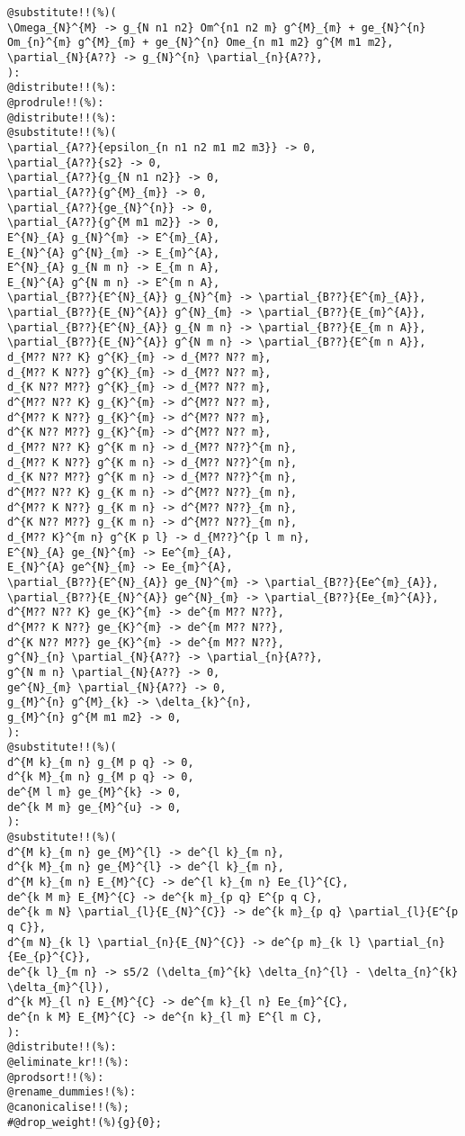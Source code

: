 \documentclass[11pt]{article}
\begin{document}
{\color[named]{Blue}\begin{verbatim}
@substitute!!(%)(
\Omega_{N}^{M} -> g_{N n1 n2} Om^{n1 n2 m} g^{M}_{m} + ge_{N}^{n} Om_{n}^{m} g^{M}_{m} + ge_{N}^{n} Ome_{n m1 m2} g^{M m1 m2},
\partial_{N}{A??} -> g_{N}^{n} \partial_{n}{A??},
):
@distribute!!(%):
@prodrule!!(%):
@distribute!!(%):
@substitute!!(%)(
\partial_{A??}{epsilon_{n n1 n2 m1 m2 m3}} -> 0,
\partial_{A??}{s2} -> 0,
\partial_{A??}{g_{N n1 n2}} -> 0,
\partial_{A??}{g^{M}_{m}} -> 0,
\partial_{A??}{ge_{N}^{n}} -> 0,
\partial_{A??}{g^{M m1 m2}} -> 0,
E^{N}_{A} g_{N}^{m} -> E^{m}_{A},
E_{N}^{A} g^{N}_{m} -> E_{m}^{A},
E^{N}_{A} g_{N m n} -> E_{m n A},
E_{N}^{A} g^{N m n} -> E^{m n A},
\partial_{B??}{E^{N}_{A}} g_{N}^{m} -> \partial_{B??}{E^{m}_{A}},
\partial_{B??}{E_{N}^{A}} g^{N}_{m} -> \partial_{B??}{E_{m}^{A}},
\partial_{B??}{E^{N}_{A}} g_{N m n} -> \partial_{B??}{E_{m n A}},
\partial_{B??}{E_{N}^{A}} g^{N m n} -> \partial_{B??}{E^{m n A}},
d_{M?? N?? K} g^{K}_{m} -> d_{M?? N?? m},
d_{M?? K N??} g^{K}_{m} -> d_{M?? N?? m},
d_{K N?? M??} g^{K}_{m} -> d_{M?? N?? m},
d^{M?? N?? K} g_{K}^{m} -> d^{M?? N?? m},
d^{M?? K N??} g_{K}^{m} -> d^{M?? N?? m},
d^{K N?? M??} g_{K}^{m} -> d^{M?? N?? m},
d_{M?? N?? K} g^{K m n} -> d_{M?? N??}^{m n},
d_{M?? K N??} g^{K m n} -> d_{M?? N??}^{m n},
d_{K N?? M??} g^{K m n} -> d_{M?? N??}^{m n},
d^{M?? N?? K} g_{K m n} -> d^{M?? N??}_{m n},
d^{M?? K N??} g_{K m n} -> d^{M?? N??}_{m n},
d^{K N?? M??} g_{K m n} -> d^{M?? N??}_{m n},
d_{M?? K}^{m n} g^{K p l} -> d_{M??}^{p l m n},
E^{N}_{A} ge_{N}^{m} -> Ee^{m}_{A},
E_{N}^{A} ge^{N}_{m} -> Ee_{m}^{A},
\partial_{B??}{E^{N}_{A}} ge_{N}^{m} -> \partial_{B??}{Ee^{m}_{A}},
\partial_{B??}{E_{N}^{A}} ge^{N}_{m} -> \partial_{B??}{Ee_{m}^{A}},
d^{M?? N?? K} ge_{K}^{m} -> de^{m M?? N??},
d^{M?? K N??} ge_{K}^{m} -> de^{m M?? N??},
d^{K N?? M??} ge_{K}^{m} -> de^{m M?? N??},
g^{N}_{n} \partial_{N}{A??} -> \partial_{n}{A??},
g^{N m n} \partial_{N}{A??} -> 0,
ge^{N}_{m} \partial_{N}{A??} -> 0,
g_{M}^{n} g^{M}_{k} -> \delta_{k}^{n},
g_{M}^{n} g^{M m1 m2} -> 0,
):
@substitute!!(%)(
d^{M k}_{m n} g_{M p q} -> 0,
d^{k M}_{m n} g_{M p q} -> 0,
de^{M l m} ge_{M}^{k} -> 0,
de^{k M m} ge_{M}^{u} -> 0,
):
@substitute!!(%)(
d^{M k}_{m n} ge_{M}^{l} -> de^{l k}_{m n},
d^{k M}_{m n} ge_{M}^{l} -> de^{l k}_{m n},
d^{M k}_{m n} E_{M}^{C} -> de^{l k}_{m n} Ee_{l}^{C},
de^{k M m} E_{M}^{C} -> de^{k m}_{p q} E^{p q C},
de^{k m N} \partial_{l}{E_{N}^{C}} -> de^{k m}_{p q} \partial_{l}{E^{p q C}},
d^{m N}_{k l} \partial_{n}{E_{N}^{C}} -> de^{p m}_{k l} \partial_{n}{Ee_{p}^{C}},
de^{k l}_{m n} -> s5/2 (\delta_{m}^{k} \delta_{n}^{l} - \delta_{n}^{k} \delta_{m}^{l}),
d^{k M}_{l n} E_{M}^{C} -> de^{m k}_{l n} Ee_{m}^{C},
de^{n k M} E_{M}^{C} -> de^{n k}_{l m} E^{l m C},
):
@distribute!!(%):
@eliminate_kr!!(%):
@prodsort!!(%):
@rename_dummies!(%):
@canonicalise!!(%);
#@drop_weight!(%){g}{0};
\end{verbatim}}
\end{document}
